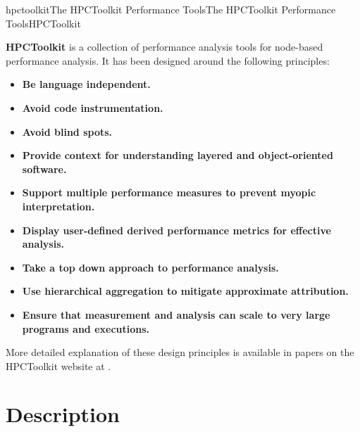 \documentclass[english]{article}
\begin{document}
\begin{Name}{1}{hpctoolkit}{The HPCToolkit Performance Tools}{The HPCToolkit Performance Tools}{HPCToolkit}

\textbf{HPCToolkit} is a collection of performance analysis tools for node-based performance analysis.
It has been designed around the following principles:
\begin{itemize}

\item \textbf{Be language independent.}
\item \textbf{Avoid code instrumentation.}
\item \textbf{Avoid blind spots.}
\item \textbf{Provide context for understanding layered and object-oriented software.}
\item \textbf{Support multiple performance measures to prevent myopic interpretation.}
\item \textbf{Display user-defined derived performance metrics for effective analysis.}
\item \textbf{Take a top down approach to performance analysis.}
\item \textbf{Use hierarchical aggregation to mitigate approximate attribution.}
\item \textbf{Ensure that measurement and analysis can scale to very large programs and executions.}

\end{itemize}

More detailed explanation of these design principles is available
in papers on the HPCToolkit website at .

\end{Name}

\section{Description}
\end{document}

